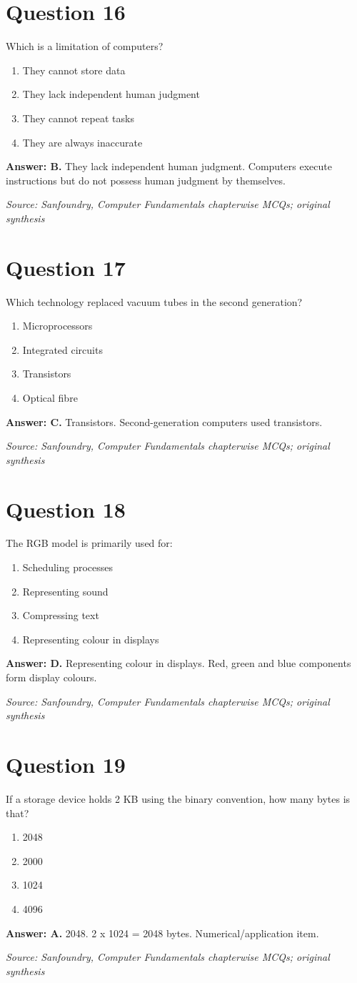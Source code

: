 \documentclass[11pt,a4paper]{book}
\newcommand{\source}[1]{\par\smallskip\textit{Source: #1}}
\newcommand{\answer}[2]{\par\textbf{Answer: #1.} #2}
\begin{document}
\section*{Question 16}
Which is a limitation of computers?
\begin{enumerate}[label=\Alph*.]
\item They cannot store data
\item They lack independent human judgment
\item They cannot repeat tasks
\item They are always inaccurate
\end{enumerate}
\answer{B}{They lack independent human judgment. Computers execute instructions but do not possess human judgment by themselves.}
\source{Sanfoundry, Computer Fundamentals chapterwise MCQs; original synthesis}
\section*{Question 17}
Which technology replaced vacuum tubes in the second generation?
\begin{enumerate}[label=\Alph*.]
\item Microprocessors
\item Integrated circuits
\item Transistors
\item Optical fibre
\end{enumerate}
\answer{C}{Transistors. Second-generation computers used transistors.}
\source{Sanfoundry, Computer Fundamentals chapterwise MCQs; original synthesis}
\section*{Question 18}
The RGB model is primarily used for:
\begin{enumerate}[label=\Alph*.]
\item Scheduling processes
\item Representing sound
\item Compressing text
\item Representing colour in displays
\end{enumerate}
\answer{D}{Representing colour in displays. Red, green and blue components form display colours.}
\source{Sanfoundry, Computer Fundamentals chapterwise MCQs; original synthesis}
\section*{Question 19}
If a storage device holds 2 KB using the binary convention, how many bytes is that?
\begin{enumerate}[label=\Alph*.]
\item 2048
\item 2000
\item 1024
\item 4096
\end{enumerate}
\answer{A}{2048. 2 x 1024 = 2048 bytes. Numerical/application item.}
\source{Sanfoundry, Computer Fundamentals chapterwise MCQs; original synthesis}
\end{document}
